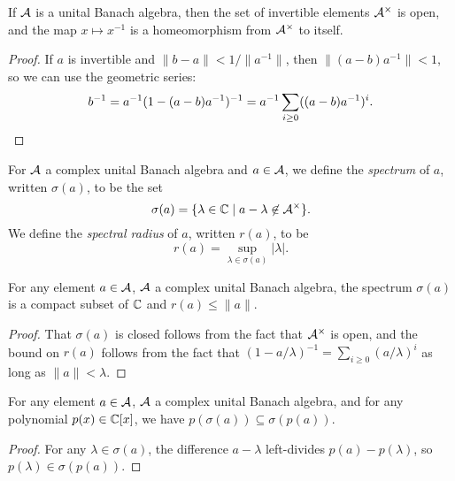 \begin{prop} If $\mathcal{A}$ is a unital Banach algebra, then the set of invertible elements $\mathcal{A}^\times$ is open, and the map $x \mapsto x^{-1}$ is a homeomorphism from $\mathcal{A}^\times$ to itself.
\end{prop}
\begin{proof} If $a$ is invertible and $\|b - a\| < 1/\|a^{-1}\|$, then $\|(a-b)a^{-1}\| < 1$, so we can use the geometric series:
\[
b^{-1} = a^{-1}(1 - (a-b)a^{-1})^{-1} = a^{-1} \sum_{i \ge 0} ((a-b)a^{-1})^i.\qedhere
\]
\end{proof}

\begin{defn} For $\mathcal{A}$ a complex unital Banach algebra and $a \in \mathcal{A}$, we define the \emph{spectrum} of $a$, written $\sigma(a)$, to be the set
\[
\sigma(a) = \{\lambda \in \mathbb{C} \mid a - \lambda \not\in \mathcal{A}^\times\}.
\]
We define the \emph{spectral radius} of $a$, written $r(a)$, to be
\[
r(a) = \sup_{\lambda \in \sigma(a)} |\lambda|.
\]
\end{defn}

\begin{prop} For any element $a \in \mathcal{A}$, $\mathcal{A}$ a complex unital Banach algebra, the spectrum $\sigma(a)$ is a compact subset of $\mathbb{C}$ and $r(a) \le \|a\|$.
\end{prop}
\begin{proof} That $\sigma(a)$ is closed follows from the fact that $\mathcal{A}^\times$ is open, and the bound on $r(a)$ follows from the fact that $(1 - a/\lambda)^{-1} = \sum_{i \ge 0} (a/\lambda)^i$ as long as $\|a\| < \lambda$.
\end{proof}

\begin{prop} For any element $a \in \mathcal{A}$, $\mathcal{A}$ a complex unital Banach algebra, and for any polynomial $p(x) \in \mathbb{C}[x]$, we have $p(\sigma(a)) \subseteq \sigma(p(a))$.
\end{prop}
\begin{proof} For any $\lambda \in \sigma(a)$, the difference $a-\lambda$ left-divides $p(a) - p(\lambda)$, so $p(\lambda) \in \sigma(p(a))$.
\end{proof}

